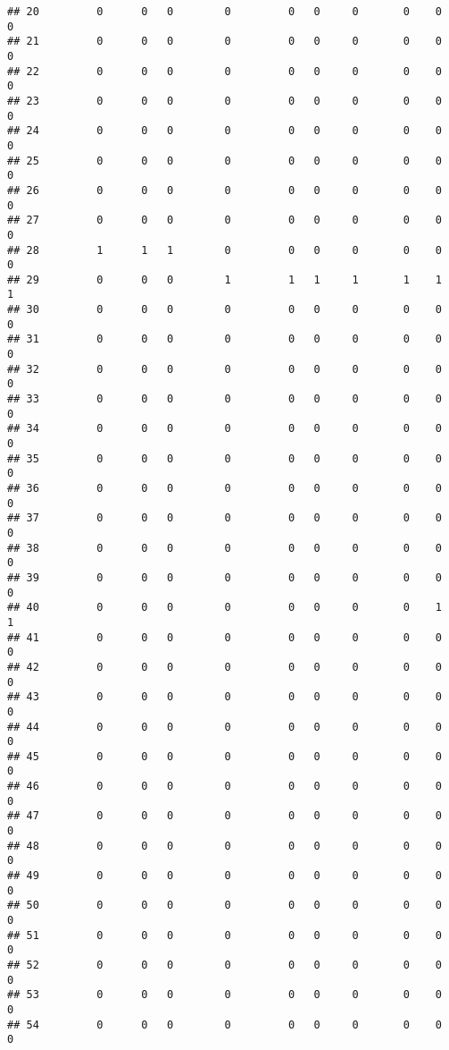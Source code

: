 \documentclass[
]{article}
\begin{document}
\begin{verbatim}
## 20         0      0   0        0         0   0     0       0    0     0
## 21         0      0   0        0         0   0     0       0    0     0
## 22         0      0   0        0         0   0     0       0    0     0
## 23         0      0   0        0         0   0     0       0    0     0
## 24         0      0   0        0         0   0     0       0    0     0
## 25         0      0   0        0         0   0     0       0    0     0
## 26         0      0   0        0         0   0     0       0    0     0
## 27         0      0   0        0         0   0     0       0    0     0
## 28         1      1   1        0         0   0     0       0    0     0
## 29         0      0   0        1         1   1     1       1    1     1
## 30         0      0   0        0         0   0     0       0    0     0
## 31         0      0   0        0         0   0     0       0    0     0
## 32         0      0   0        0         0   0     0       0    0     0
## 33         0      0   0        0         0   0     0       0    0     0
## 34         0      0   0        0         0   0     0       0    0     0
## 35         0      0   0        0         0   0     0       0    0     0
## 36         0      0   0        0         0   0     0       0    0     0
## 37         0      0   0        0         0   0     0       0    0     0
## 38         0      0   0        0         0   0     0       0    0     0
## 39         0      0   0        0         0   0     0       0    0     0
## 40         0      0   0        0         0   0     0       0    1     1
## 41         0      0   0        0         0   0     0       0    0     0
## 42         0      0   0        0         0   0     0       0    0     0
## 43         0      0   0        0         0   0     0       0    0     0
## 44         0      0   0        0         0   0     0       0    0     0
## 45         0      0   0        0         0   0     0       0    0     0
## 46         0      0   0        0         0   0     0       0    0     0
## 47         0      0   0        0         0   0     0       0    0     0
## 48         0      0   0        0         0   0     0       0    0     0
## 49         0      0   0        0         0   0     0       0    0     0
## 50         0      0   0        0         0   0     0       0    0     0
## 51         0      0   0        0         0   0     0       0    0     0
## 52         0      0   0        0         0   0     0       0    0     0
## 53         0      0   0        0         0   0     0       0    0     0
## 54         0      0   0        0         0   0     0       0    0     0

\end{verbatim}
\end{document}
